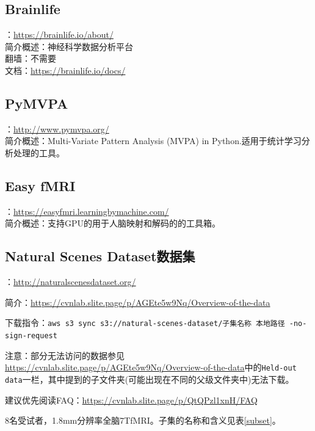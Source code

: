 \documentclass[12pt, a4paper, oneside]{ctexart}
\begin{document}
    \subsection{Brainlife}
    ：\url{https://brainlife.io/about/}\\
    简介概述：神经科学数据分析平台\\
    翻墙：不需要\\
    文档：\url{https://brainlife.io/docs/}

    \subsection{PyMVPA}
    ：\url{http://www.pymvpa.org/}\\
    简介概述：Multi-Variate Pattern Analysis (MVPA) in Python.适用于统计学习分析处理的工具。

    \subsection{Easy fMRI}
    ：\url{https://easyfmri.learningbymachine.com/}\\
    简介概述：支持GPU的用于人脑映射和解码的的工具箱。

    \subsection{Natural Scenes Dataset数据集\cite{Allen2022}}
    ：\url{http://naturalscenesdataset.org/}

    简介：\url{https://cvnlab.slite.page/p/AGEte5w9Nq/Overview-of-the-data}

    下载指令：\texttt{aws s3 sync s3://natural-scenes-dataset/子集名称~本地路径 -no-sign-request}


    注意：部分无法访问的数据参见\url{https://cvnlab.slite.page/p/AGEte5w9Nq/Overview-of-the-data}中的\texttt{Held-out data}一栏，其中提到的子文件夹(可能出现在不同的父级文件夹中)无法下载。

    建议优先阅读FAQ：\url{https://cvnlab.slite.page/p/QtQPzl1xnH/FAQ}

    8名受试者，1.8mm分辨率全脑7TfMRI。子集的名称和含义见表\ref{subset}。
\end{document}

